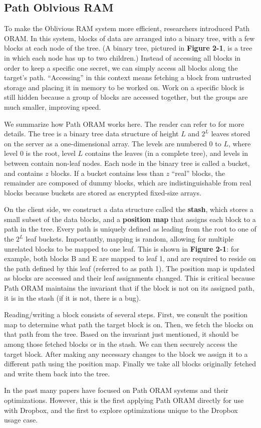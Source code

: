 \documentclass{article}
\begin{document}
\begin{multicols}{2}
\subsection{Path Oblvious RAM}
To make the Oblivious RAM system more efficient, researchers introduced Path ORAM. In this system, blocks of data are arranged into a binary tree, with a few blocks at each node of the tree. (A binary tree, pictured in {\bf Figure 2-1}, is a tree in which each node has up to two children.) Instead of accessing all blocks in order to keep a specific one secret, we can simply access all blocks along the target’s path. “Accessing” in this context means fetching a block from untrusted storage and placing it in memory to be worked on. Work on a specific block is still hidden because a group of blocks are accessed together, but the groups are much smaller, improving speed. %
\par We summarize how Path ORAM works here. The reader can refer to \cite{Stefanov2} for more details. The tree is a binary tree data structure of height $L$ and $2^L$ leaves stored on the server as a one-dimensional array. The levels are numbered 0 to $L$, where level 0 is the root, level $L$ contains the leaves (in a complete tree), and levels in between contain non-leaf nodes. Each node in the binary tree is called a bucket, and contains $z$ blocks. If a bucket contains less than $z$ “real” blocks, the remainder are composed of dummy blocks, which are indistinguishable from real blocks because buckets are stored as encrypted fixed-size arrays.
\par On the client side, we construct a data structure called the {\bf stash}, which stores a small subset of the data blocks, and a {\bf position map} that assigns each block to a path in the tree. Every path is uniquely defined as leading from the root to one of the $2^L$ leaf buckets. Importantly, mapping is random, allowing for multiple unrelated blocks to be mapped to one leaf. This is shown in {\bf Figure 2-1}: for example, both blocks B and E are mapped to leaf 1, and are required to reside on the path defined by this leaf (referred to as path 1). The position map is updated as blocks are accessed and their leaf assignments changed. This is critical because Path ORAM maintains the invariant that if the block is not on its assigned path, it is in the stash (if it is not, there is a bug).
\par Reading/writing a block consists of several steps. First, we consult the position map to determine what path the target block is on. Then, we fetch the blocks on that path from the tree. Based on the invariant just mentioned, it should be among those fetched blocks or in the stash. We can then securely access the target block. After making any necessary changes to the block we assign it to a different path using the position map. Finally we take all blocks originally fetched and write them back into the tree.
\par In the past many papers have focused on Path ORAM systems and their optimizations. However, this is the first applying Path ORAM directly for use with Dropbox, and the first to explore optimizations unique to the Dropbox usage case.


\end{multicols}
\end{document}
